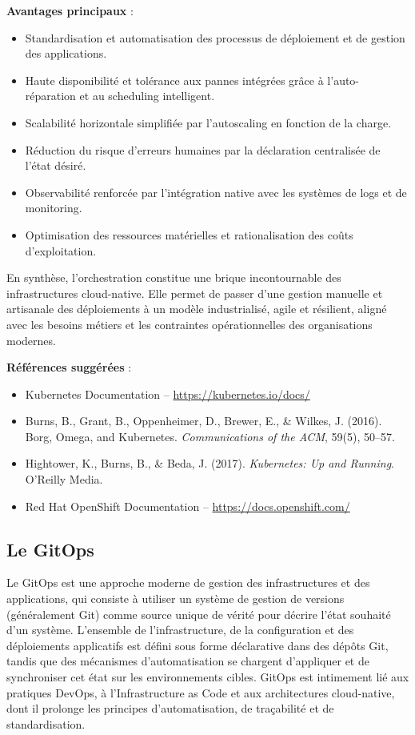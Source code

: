 \textbf{Avantages principaux} :
\begin{itemize}
	\item Standardisation et automatisation des processus de déploiement et de gestion des applications.
	\item Haute disponibilité et tolérance aux pannes intégrées grâce à l’auto-réparation et au scheduling intelligent.
	\item Scalabilité horizontale simplifiée par l’autoscaling en fonction de la charge.
	\item Réduction du risque d’erreurs humaines par la déclaration centralisée de l’état désiré.
	\item Observabilité renforcée par l’intégration native avec les systèmes de logs et de monitoring.
	\item Optimisation des ressources matérielles et rationalisation des coûts d’exploitation.
\end{itemize}

En synthèse, l’orchestration constitue une brique incontournable des infrastructures cloud-native. Elle permet de passer d’une gestion manuelle et artisanale des déploiements à un modèle industrialisé, agile et résilient, aligné avec les besoins métiers et les contraintes opérationnelles des organisations modernes.

\textbf{Références suggérées} :
\begin{itemize}
	\item Kubernetes Documentation – \url{https://kubernetes.io/docs/}
	\item Burns, B., Grant, B., Oppenheimer, D., Brewer, E., \& Wilkes, J. (2016). Borg, Omega, and Kubernetes. \textit{Communications of the ACM}, 59(5), 50–57.
	\item Hightower, K., Burns, B., \& Beda, J. (2017). \textit{Kubernetes: Up and Running}. O’Reilly Media.
	\item Red Hat OpenShift Documentation – \url{https://docs.openshift.com/}
\end{itemize}

\subsection{Le GitOps}

Le GitOps est une approche moderne de gestion des infrastructures et des applications, qui consiste à utiliser un système de gestion de versions (généralement Git) comme source unique de vérité pour décrire l’état souhaité d’un système. L’ensemble de l’infrastructure, de la configuration et des déploiements applicatifs est défini sous forme déclarative dans des dépôts Git, tandis que des mécanismes d’automatisation se chargent d’appliquer et de synchroniser cet état sur les environnements cibles. GitOps est intimement lié aux pratiques DevOps, à l’Infrastructure as Code et aux architectures cloud-native, dont il prolonge les principes d’automatisation, de traçabilité et de standardisation.

